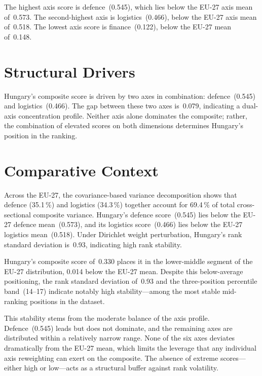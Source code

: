 \documentclass[12pt,a4paper]{article}
\begin{document}
The highest axis score is defence~(0.545), which lies below the EU-27 axis mean of~0.573.  The second-highest axis is logistics~(0.466), below the EU-27 axis mean of~0.518.  The lowest axis score is finance~(0.122), below the EU-27 mean of~0.148.


\section{Structural Drivers}
\label{sec:drivers}

\begin{sloppypar}
Hungary's composite score is driven by two axes in combination: defence~(0.545) and logistics~(0.466).  The gap between these two axes is~0.079, indicating a dual-axis concentration profile.  Neither axis alone dominates the composite; rather, the combination of elevated scores on both dimensions determines Hungary's position in the ranking.
\end{sloppypar}


\section{Comparative Context}
\label{sec:comparative}

Across the EU-27, the covariance-based variance decomposition shows that defence (35.1\,\%) and logistics (34.3\,\%) together account for 69.4\,\% of total cross-sectional composite variance.  Hungary's defence score~(0.545) lies below the EU-27 defence mean~(0.573), and its logistics score~(0.466) lies below the EU-27 logistics mean~(0.518).  Under Dirichlet weight perturbation, Hungary's rank standard deviation is~0.93, indicating high rank stability.



Hungary's composite score of~0.330 places it in the lower-middle segment of the EU-27 distribution, 0.014 below the EU-27 mean.  Despite this below-average positioning, the rank standard deviation of~0.93 and the three-position percentile band~(14--17) indicate notably high stability---among the most stable mid-ranking positions in the dataset.

This stability stems from the moderate balance of the axis profile.  Defence~(0.545) leads but does not dominate, and the remaining axes are distributed within a relatively narrow range.  None of the six axes deviates dramatically from the EU-27 mean, which limits the leverage that any individual axis reweighting can exert on the composite.  The absence of extreme scores---either high or low---acts as a structural buffer against rank volatility.
\end{document}
